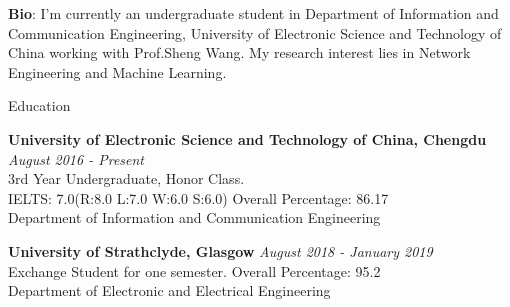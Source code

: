 \documentclass{resume} %
\begin{document}
{\bf Bio}: I'm currently an undergraduate student in Department of Information and Communication Engineering, 
University of Electronic Science and Technology of China working with Prof.Sheng Wang. My research interest lies in Network Engineering and Machine Learning.

\begin{rSection}{Education}

\item \vspace{-1em} {\bf University of Electronic Science and Technology of China, Chengdu} \hfill {\em August 2016 - Present} 
\\ 3rd Year Undergraduate, Honor Class. 
\\IELTS: 7.0(R:8.0 L:7.0 W:6.0 S:6.0)\hfill { Overall Percentage: 86.17 }
\\ Department of Information and Communication Engineering


\item {\bf University of Strathclyde, Glasgow} \hfill {\em August 2018 - January 2019} 
\\ Exchange Student for one semester.\hfill { Overall Percentage: 95.2 }
\\Department of Electronic and Electrical Engineering 


\end{rSection}
\end{document}
